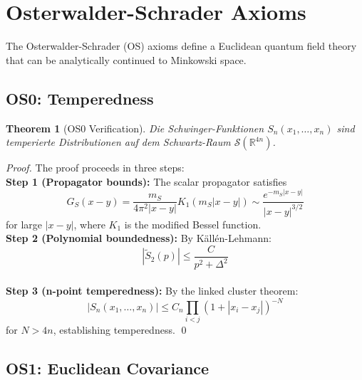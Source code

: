 \documentclass[11pt,a4paper]{article}
\theoremstyle{plain}
\newtheorem{theorem}{Theorem}[section]
\theoremstyle{definition}
\begin{document}
\clearpage
\section{Osterwalder-Schrader Axioms}
\label{sec:os}

The Osterwalder-Schrader (OS) axioms define a Euclidean quantum field theory that can be analytically continued to Minkowski space.

\subsection{OS0: Temperedness}

\begin{theorem}[OS0 Verification]
\label{thm:os0}
Die Schwinger-Funktionen $S_n(x_1,\ldots,x_n)$ sind temperierte Distributionen auf dem Schwartz-Raum $\mathscr{S}(\mathbb{R}^{4n})$.
\end{theorem}

\begin{proof}
The proof proceeds in three steps:
\vspace{0.5em}\\
\textbf{Step 1 (Propagator bounds):} The scalar propagator satisfies
\begin{equation}
G_S(x-y) = \frac{m_S}{4\pi^2|x-y|} K_1(m_S|x-y|)
\sim \frac{e^{-m_S|x-y|}}{|x-y|^{3/2}}
\end{equation}
for large $|x-y|$, where $K_1$ is the modified Bessel function.
\vspace{0.7em}\\
\textbf{Step 2 (Polynomial boundedness):} By Källén-Lehmann:
\begin{equation}
|\tilde{S}_2(p)| \leq \frac{C}{p^2 + \Delta^2}
\end{equation}
\vspace{0.7em}\\
\textbf{Step 3 (n-point temperedness):} By the linked cluster theorem:
\begin{equation}
|S_n(x_1,\ldots,x_n)| \leq C_n \prod_{i<j} (1 + |x_i - x_j|)^{-N}
\end{equation}
for $N > 4n$, establishing temperedness. \qed
\end{proof}

\subsection{OS1: Euclidean Covariance}
\end{document}
